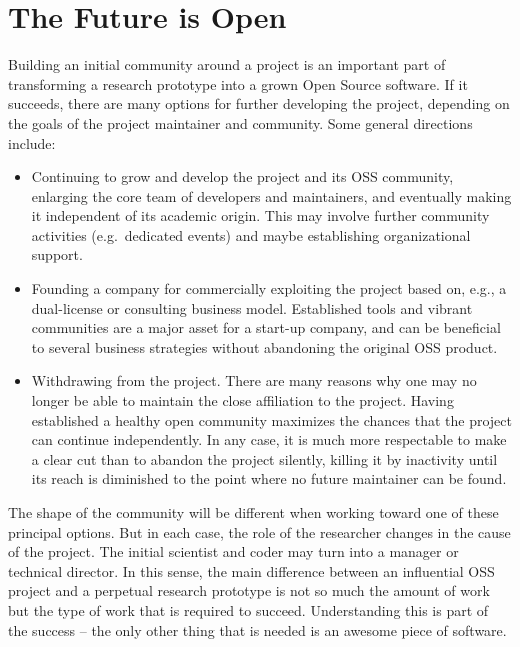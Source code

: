 \section*{The Future is Open}

Building an initial community around a project is an important part of transforming a research prototype into a grown Open Source software. If it succeeds, there are many options for further developing the project, depending on the goals of the project maintainer and community. Some general directions include:
%
\begin{itemize}
\item Continuing to grow and develop the project and its OSS community, enlarging the core team of developers and maintainers, and eventually making it independent of its academic origin. This may involve further community activities (e.g.\ dedicated events) and maybe establishing organizational support.
%
\item Founding a company for commercially exploiting the project based on, e.g., a dual-license or consulting business model. Established tools and vibrant communities are a major asset for a start-up company, and can be beneficial to several business strategies without abandoning the original OSS product.
%
\item Withdrawing from the project. There are many reasons why one may no longer be able to maintain the close affiliation to the project. Having established a healthy open community maximizes the chances that the project can continue independently. In any case, it is much more respectable to make a clear cut than to abandon the project silently, killing it by inactivity until its reach is diminished to the point where no future maintainer can be found.
\end{itemize}
%
The shape of the community will be different when working toward one of these principal options. But in each case, the role of the researcher changes in the cause of the project. The initial scientist and coder may turn into a manager or technical director. In this sense, the main difference between an influential OSS project and a perpetual research prototype is not so much the amount of work but the type of work that is required to succeed. Understanding this is part of the success -- the only other thing that is needed is an awesome piece of software.
